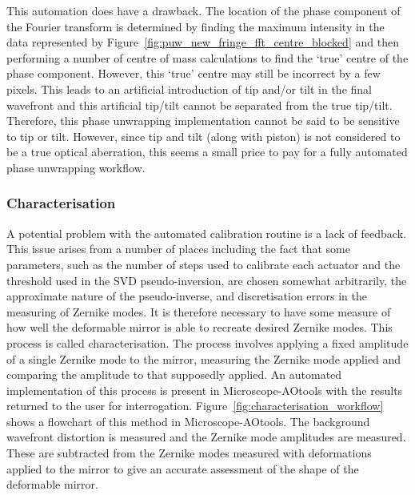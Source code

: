 This automation does have a drawback. The location of the phase component of the Fourier transform is determined by finding the maximum intensity in the data represented by Figure~\ref{fig:puw_new_fringe_fft_centre_blocked} and then performing a number of centre of mass calculations to find the `true' centre of the phase component. However, this `true' centre may still be incorrect by a few pixels. This leads to an artificial introduction of tip and/or tilt in the final wavefront and this artificial tip/tilt cannot be separated from the true tip/tilt. Therefore, this phase unwrapping implementation cannot be said to be sensitive to tip or tilt. However, since tip and tilt (along with piston) is not considered to be a true optical aberration, this seems a small price to pay for a fully automated phase unwrapping workflow.

\subsubsection{Characterisation}

A potential problem with the automated calibration routine is a lack of feedback. This issue arises from a number of places including the fact that some parameters, such as the number of steps used to calibrate each actuator and the threshold used in the SVD pseudo-inversion, are chosen somewhat arbitrarily, the approximate nature of the pseudo-inverse, and discretisation errors in the measuring of Zernike modes. It is therefore necessary to have some measure of how well the deformable mirror is able to recreate desired Zernike modes. This process is called characterisation. The process involves applying a fixed amplitude of a single Zernike mode to the mirror, measuring the Zernike mode applied and comparing the amplitude to that supposedly applied. An automated implementation of this process is present in Microscope-AOtools with the results returned to the user for interrogation. Figure~\ref{fig:characterisation_workflow} shows a flowchart of this method in Microscope-AOtools. The background wavefront distortion is measured and the Zernike mode amplitudes are measured. These are subtracted from the Zernike modes measured with deformations applied to the mirror to give an accurate assessment of the shape of the deformable mirror. 


